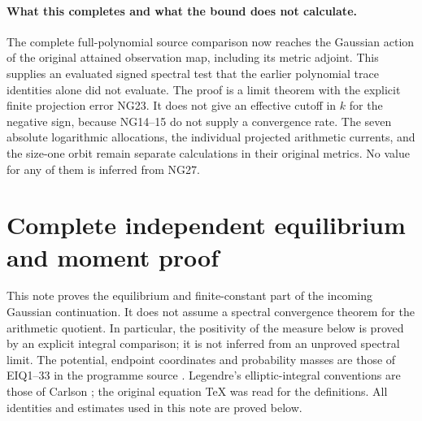 \documentclass[11pt]{article}
\begin{document}
\paragraph{What this completes and what the bound does not calculate.}
The complete full-polynomial source comparison now reaches the Gaussian
action of the original attained observation map, including its metric
adjoint. This supplies an evaluated signed spectral test that the earlier
polynomial trace identities alone did not evaluate. The proof is a limit
theorem with the explicit finite projection error NG23. It does not give
an effective cutoff in $k$ for the negative sign, because NG14--15 do not
supply a convergence rate. The seven absolute logarithmic allocations,
the individual projected arithmetic currents, and the size-one orbit
remain separate calculations in their original metrics. No value for
any of them is inferred from NG27.



\clearpage
\section*{Complete independent equilibrium and moment proof}

This note proves the equilibrium and finite-constant part of the incoming
Gaussian continuation. It does not assume a spectral convergence theorem
for the arithmetic quotient. In particular, the positivity of the measure
below is proved by an explicit integral comparison; it is not inferred
from an unproved spectral limit. The potential, endpoint coordinates and
probability masses are those of EIQ1--33 in the programme source
\cite{EIQ}. Legendre's elliptic-integral conventions are those of Carlson
\cite{Carlson}; the original equation TeX was read for the definitions.
All identities and estimates used in this note are proved below.
\end{document}
